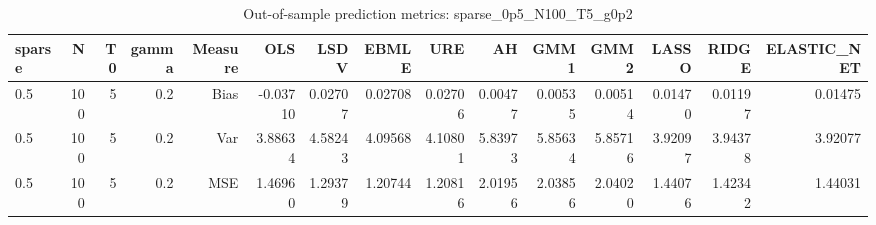 \begin{table}[!htbp]\centering
\caption{Out-of-sample prediction metrics: sparse_0p5_N100_T5_g0p2}
\label{tab:table3_sparse_0p5_N100_T5_g0p2}
\begin{tabular}{lrrrrrrrrrrrrrr}
\hline
sparse & N & T0 & gamma & Measure & OLS & LSDV & EBMLE & URE & AH & GMM1 & GMM2 & LASSO & RIDGE & ELASTIC_NET \\
\hline
0.5 & 100 & 5 & 0.2 & Bias & -0.03710 & 0.02707 & 0.02708 & 0.02706 & 0.00477 & 0.00535 & 0.00514 & 0.01470 & 0.01197 & 0.01475 \\
0.5 & 100 & 5 & 0.2 & Var & 3.88634 & 4.58243 & 4.09568 & 4.10801 & 5.83973 & 5.85634 & 5.85716 & 3.92097 & 3.94378 & 3.92077 \\
0.5 & 100 & 5 & 0.2 & MSE & 1.46960 & 1.29379 & 1.20744 & 1.20816 & 2.01956 & 2.03856 & 2.04020 & 1.44076 & 1.42342 & 1.44031 \\
\hline
\end{tabular}
\end{table}

